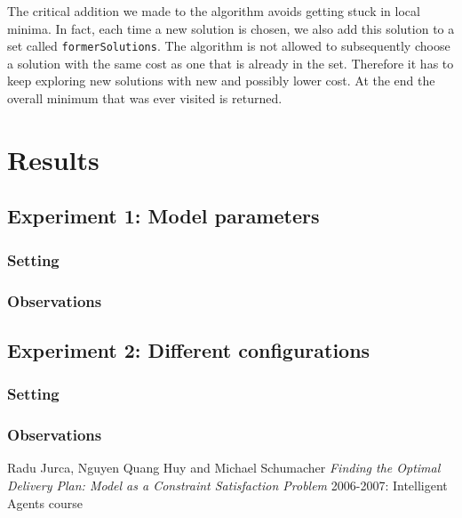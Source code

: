 \documentclass[11pt]{article}
\begin{document}
The critical addition we made to the algorithm avoids getting stuck in local 
minima. In fact, each time a new solution is chosen, we also add this solution 
to a set called \texttt{formerSolutions}. The algorithm is not allowed to 
subsequently choose a solution with the same cost as one that is already in the 
set. Therefore it has to keep exploring new solutions with new and possibly 
lower cost. At the end the overall minimum that was ever visited is returned.


\section{Results}

\subsection{Experiment 1: Model parameters}

\subsubsection{Setting} 

\subsubsection{Observations}

\subsection{Experiment 2: Different configurations}

\subsubsection{Setting}

\subsubsection{Observations}



\begin{thebibliography}{1}

 Radu Jurca, Nguyen Quang Huy and Michael
Schumacher {\em Finding the Optimal Delivery Plan: Model as a
Constraint Satisfaction Problem} 2006-2007: Intelligent Agents course
\end{thebibliography}
\end{document}
